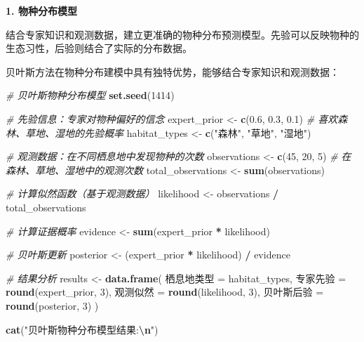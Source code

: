 \documentclass[
]{book}
\newenvironment{Shaded}{\begin{snugshade}}{\end{snugshade}}
\newcommand{\CommentTok}[1]{\textcolor[rgb]{0.56,0.35,0.01}{\textit{#1}}}
\newcommand{\DecValTok}[1]{\textcolor[rgb]{0.00,0.00,0.81}{#1}}
\newcommand{\FloatTok}[1]{\textcolor[rgb]{0.00,0.00,0.81}{#1}}
\newcommand{\FunctionTok}[1]{\textcolor[rgb]{0.13,0.29,0.53}{\textbf{#1}}}
\newcommand{\NormalTok}[1]{#1}
\newcommand{\OtherTok}[1]{\textcolor[rgb]{0.56,0.35,0.01}{#1}}
\newcommand{\SpecialCharTok}[1]{\textcolor[rgb]{0.81,0.36,0.00}{\textbf{#1}}}
\newcommand{\StringTok}[1]{\textcolor[rgb]{0.31,0.60,0.02}{#1}}
\begin{document}
\textbf{1. 物种分布模型}

结合专家知识和观测数据，建立更准确的物种分布预测模型。先验可以反映物种的生态习性，后验则结合了实际的分布数据。

贝叶斯方法在物种分布建模中具有独特优势，能够结合专家知识和观测数据：

\begin{Shaded}
\begin{Highlighting}[]
\CommentTok{\# 贝叶斯物种分布模型}
\FunctionTok{set.seed}\NormalTok{(}\DecValTok{1414}\NormalTok{)}

\CommentTok{\# 先验信息：专家对物种偏好的信念}
\NormalTok{expert\_prior }\OtherTok{\textless{}{-}} \FunctionTok{c}\NormalTok{(}\FloatTok{0.6}\NormalTok{, }\FloatTok{0.3}\NormalTok{, }\FloatTok{0.1}\NormalTok{)  }\CommentTok{\# 喜欢森林、草地、湿地的先验概率}
\NormalTok{habitat\_types }\OtherTok{\textless{}{-}} \FunctionTok{c}\NormalTok{(}\StringTok{"森林"}\NormalTok{, }\StringTok{"草地"}\NormalTok{, }\StringTok{"湿地"}\NormalTok{)}

\CommentTok{\# 观测数据：在不同栖息地中发现物种的次数}
\NormalTok{observations }\OtherTok{\textless{}{-}} \FunctionTok{c}\NormalTok{(}\DecValTok{45}\NormalTok{, }\DecValTok{20}\NormalTok{, }\DecValTok{5}\NormalTok{)      }\CommentTok{\# 在森林、草地、湿地中的观测次数}
\NormalTok{total\_observations }\OtherTok{\textless{}{-}} \FunctionTok{sum}\NormalTok{(observations)}

\CommentTok{\# 计算似然函数（基于观测数据）}
\NormalTok{likelihood }\OtherTok{\textless{}{-}}\NormalTok{ observations }\SpecialCharTok{/}\NormalTok{ total\_observations}

\CommentTok{\# 计算证据概率}
\NormalTok{evidence }\OtherTok{\textless{}{-}} \FunctionTok{sum}\NormalTok{(expert\_prior }\SpecialCharTok{*}\NormalTok{ likelihood)}

\CommentTok{\# 贝叶斯更新}
\NormalTok{posterior }\OtherTok{\textless{}{-}}\NormalTok{ (expert\_prior }\SpecialCharTok{*}\NormalTok{ likelihood) }\SpecialCharTok{/}\NormalTok{ evidence}

\CommentTok{\# 结果分析}
\NormalTok{results }\OtherTok{\textless{}{-}} \FunctionTok{data.frame}\NormalTok{(}
\NormalTok{  栖息地类型 }\OtherTok{=}\NormalTok{ habitat\_types,}
\NormalTok{  专家先验 }\OtherTok{=} \FunctionTok{round}\NormalTok{(expert\_prior, }\DecValTok{3}\NormalTok{),}
\NormalTok{  观测似然 }\OtherTok{=} \FunctionTok{round}\NormalTok{(likelihood, }\DecValTok{3}\NormalTok{),}
\NormalTok{  贝叶斯后验 }\OtherTok{=} \FunctionTok{round}\NormalTok{(posterior, }\DecValTok{3}\NormalTok{)}
\NormalTok{)}

\FunctionTok{cat}\NormalTok{(}\StringTok{"贝叶斯物种分布模型结果:}\SpecialCharTok{\textbackslash{}n}\StringTok{"}\NormalTok{)}
\end{Highlighting}
\end{Shaded}
\end{document}
